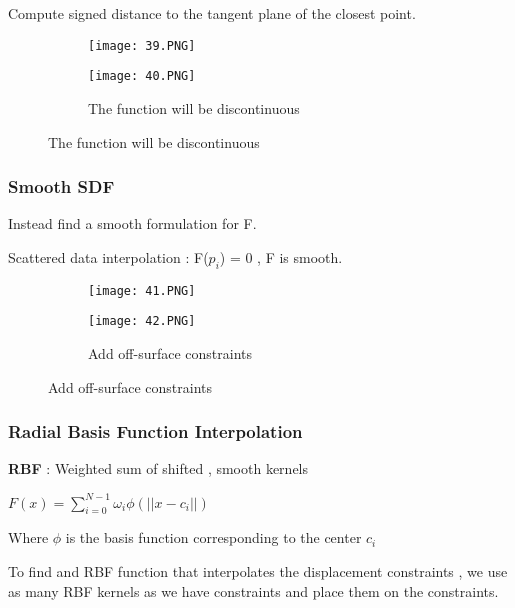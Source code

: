 \documentclass{article}
\begin{document}
\vspace{30mm}

Compute signed distance to the tangent plane of the closest point.


\begin{figure}[ht!]
  \centering
  \begin{subfigure}[b]{0.39\linewidth}
    \texttt{[image: 39.PNG]}
  \end{subfigure}
     \begin{subfigure}[b]{0.39\textwidth}
         \centering
         \texttt{[image: 40.PNG]}
         \caption{The function will be discontinuous}
     \end{subfigure}
\end{figure}


\subsubsection{Smooth SDF}

Instead find a smooth formulation for F.

Scattered data interpolation : F($p_i$) = 0 , F is smooth.

\begin{figure}[ht!]
  \centering
  \begin{subfigure}[b]{0.39\linewidth}
    \texttt{[image: 41.PNG]}
    \caption{}
  \end{subfigure}
     \begin{subfigure}[b]{0.39\textwidth}
         \centering
         \texttt{[image: 42.PNG]}
         \caption{Add off-surface constraints}
     \end{subfigure}
\end{figure}

\subsubsection{Radial Basis Function Interpolation}

\textbf{RBF} : Weighted sum of shifted , smooth kernels

$F(x) = \sum_{i = 0}^{N-1} \omega_i \phi(||x-c_i||)$

Where $\phi$ is the basis function corresponding to the center $c_i$

To find and RBF function that interpolates the displacement constraints , we use as many RBF kernels as we have constraints and place them on the constraints. 
\end{document}
